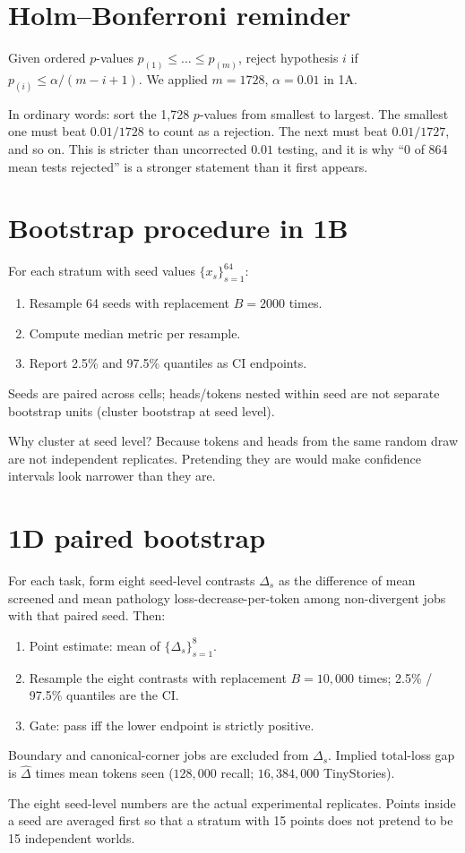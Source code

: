 \documentclass[11pt,a4paper]{report}
\begin{document}
\appendix
\chapter{Holm--Bonferroni reminder}

Given ordered $p$-values $p_{(1)}\le\dots\le p_{(m)}$, reject hypothesis $i$ if $p_{(i)}\le \alpha/(m-i+1)$. We applied $m=1728$, $\alpha=0.01$ in 1A.

In ordinary words: sort the 1{,}728 $p$-values from smallest to largest. The smallest one must beat $0.01/1728$ to count as a rejection. The next must beat $0.01/1727$, and so on. This is stricter than uncorrected $0.01$ testing, and it is why ``0 of 864 mean tests rejected'' is a stronger statement than it first appears.

\chapter{Bootstrap procedure in 1B}

For each stratum with seed values $\{x_s\}_{s=1}^{64}$:
\begin{enumerate}[leftmargin=*]
  \item Resample 64 seeds with replacement $B=2000$ times.
  \item Compute median metric per resample.
  \item Report 2.5\% and 97.5\% quantiles as CI endpoints.
\end{enumerate}
Seeds are paired across cells; heads/tokens nested within seed are not separate bootstrap units (cluster bootstrap at seed level).

Why cluster at seed level? Because tokens and heads from the same random draw are not independent replicates. Pretending they are would make confidence intervals look narrower than they are.

\chapter{1D paired bootstrap}

For each task, form eight seed-level contrasts $\Delta_s$ as the difference of mean screened and mean pathology loss-decrease-per-token among non-divergent jobs with that paired seed. Then:
\begin{enumerate}[leftmargin=*]
  \item Point estimate: mean of $\{\Delta_s\}_{s=1}^{8}$.
  \item Resample the eight contrasts with replacement $B=10{,}000$ times; 2.5\% / 97.5\% quantiles are the CI.
  \item Gate: pass iff the lower endpoint is strictly positive.
\end{enumerate}
Boundary and canonical-corner jobs are excluded from $\Delta_s$. Implied total-loss gap is $\widehat\Delta$ times mean tokens seen ($128{,}000$ recall; $16{,}384{,}000$ TinyStories).

The eight seed-level numbers are the actual experimental replicates. Points inside a seed are averaged first so that a stratum with 15 points does not pretend to be 15 independent worlds.
\end{document}
